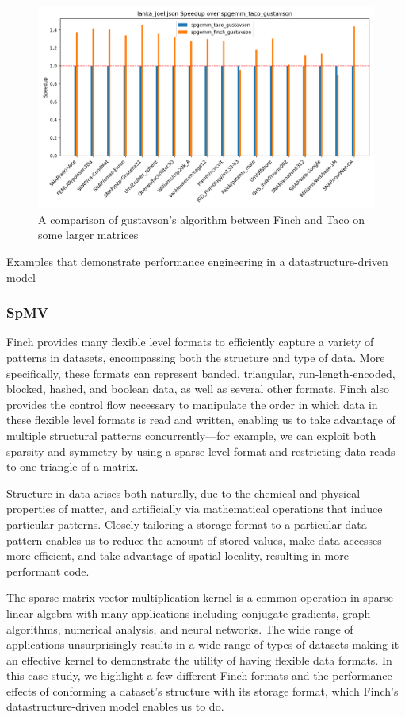 \begin{figure}
	\includegraphics[width=\linewidth]{spgemm_joel_speedup.png}
    \caption{A comparison of gustavson's algorithm between Finch and Taco on some larger matrices}
\end{figure}

Examples that demonstrate performance engineering in a datastructure-driven model

\subsubsection{SpMV}
Finch provides many flexible level formats to efficiently capture a variety of patterns in datasets, encompassing both the structure and type of data. More specifically, these formats can represent banded, triangular, run-length-encoded, blocked, hashed, and boolean data, as well as several other formats. Finch also provides the control flow necessary to manipulate the order in which data in these flexible level formats is read and written, enabling us to take advantage of multiple structural patterns concurrently—for example, we can exploit both sparsity and symmetry by using a sparse level format and restricting data reads to one triangle of a matrix. %

Structure in data arises both naturally, due to the chemical and physical properties of matter, and artificially via mathematical operations that induce particular patterns. Closely tailoring a storage format to a particular data pattern enables us to reduce the amount of stored values, make data accesses more efficient, and take advantage of spatial locality, resulting in more performant code.

The sparse matrix-vector multiplication kernel is a common operation in sparse linear algebra with many applications including conjugate gradients, graph algorithms, numerical analysis, and neural networks. The wide range of applications unsurprisingly results in a wide range of types of datasets making it an effective kernel to demonstrate the utility of having flexible data formats. In this case study, we highlight a few different Finch formats and the performance effects of conforming a dataset’s structure with its storage format, which Finch's datastructure-driven model enables us to do.

